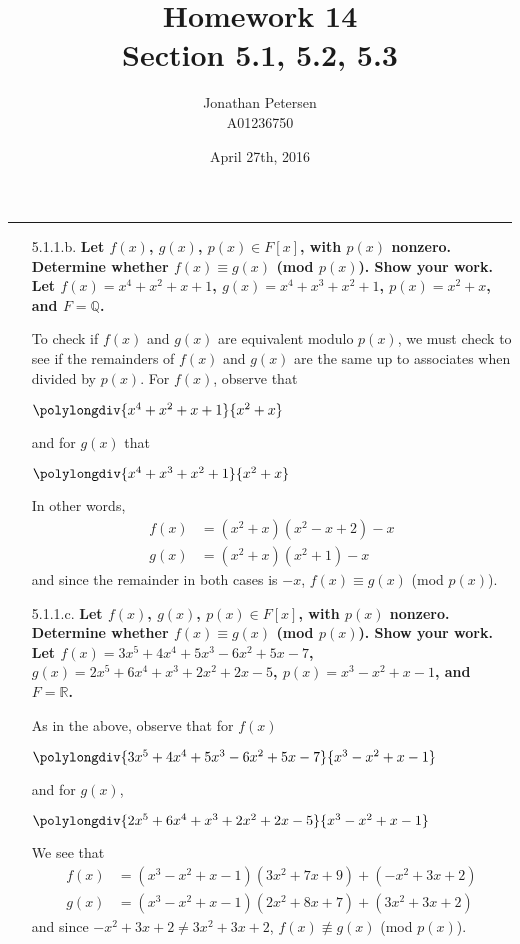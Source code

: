 \documentclass{article}
\title{Homework 14 \\ Section 5.1, 5.2, 5.3}
\author{Jonathan Petersen \\ A01236750}
\date{April 27th, 2016}
\begin{document}
	\maketitle
	\hrule 
	\vspace{5mm}
	\begin{enumerate}
		\item [5.1.1.b. ] \textbf{Let $f(x)$, $g(x)$, $p(x) \in F[x]$, with $p(x)$ nonzero. 
			Determine whether $f(x) \equiv g(x)$ (mod $p(x)$). Show your work. Let $f(x) = x^4 + x^2
			+ x + 1$, $g(x) = x^4 + x^3 + x^2 + 1$, $p(x) = x^2 + x$, and $F = \mathbb{Q}$.}

			To check if $f(x)$ and $g(x)$ are equivalent modulo $p(x)$, we must check to see if the 
			remainders of $f(x)$ and $g(x)$ are the same up to associates when divided by $p(x)$.
			For $f(x)$, observe that 

				$\polylongdiv{x^4 + x^2+ x + 1}{x^2 + x}$

			and for $g(x)$ that

				$\polylongdiv{x^4 + x^3 + x^2 + 1}{x^2 + x}$

			In other words, 
			\begin{align*}
				f(x) & = (x^2 + x)(x^2 - x + 2) - x \\
				g(x) & = (x^2 + x)(x^2 + 1) - x
			\end{align*}
			and since the remainder in both cases is $-x$, $f(x) \equiv g(x)$ (mod $p(x)$).

		\item [5.1.1.c. ] \textbf{Let $f(x)$, $g(x)$, $p(x) \in F[x]$, with $p(x)$ nonzero. 
			Determine whether $f(x) \equiv g(x)$ (mod $p(x)$). Show your work. Let $f(x) = 3x^5 + 
			4x^4 + 5x^3 - 6x^2 + 5x - 7$, $g(x) = 2x^5 + 6x^4 + x^3 + 2x^2 + 2x - 5$, $p(x) = x^3 -
			x^2 + x - 1$, and $F = \mathbb{R}$.}

			As in the above, observe that for $f(x)$

			$\polylongdiv{3x^5 + 4x^4 + 5x^3 - 6x^2 + 5x - 7}{x^3 - x^2 + x - 1}$

			and for $g(x)$,

			$\polylongdiv{2x^5 + 6x^4 + x^3 + 2x^2 + 2x - 5}{x^3 - x^2 + x - 1}$

			We see that
			\begin{align*}
				f(x) & = (x^3 - x^2 + x - 1)(3x^2 + 7x + 9) + (-x^2 + 3x + 2) \\
				g(x) & = (x^3 - x^2 + x - 1)(2x^2 + 8x + 7) + (3x^2 + 3x + 2)
			\end{align*}
			and since $-x^2 + 3x + 2 \neq 3x^2 + 3x + 2$, $f(x) \not\equiv g(x)$ (mod $p(x)$).


\end{enumerate}
\end{document}
